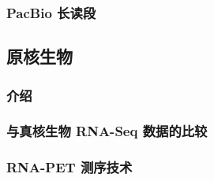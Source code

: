 \subsubsection{PacBio 长读段} %

\subsection{原核生物}

\subsubsection{介绍} %

\subsubsection{与真核生物 RNA-Seq 数据的比较} %

\subsubsection{RNA-PET 测序技术} %


